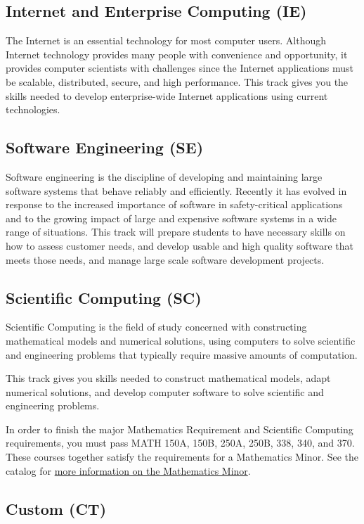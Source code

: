 \documentclass{book}
\newcommand{\IeTrackName}{Internet and Enterprise Computing (IE)}
\newcommand{\SeTrackName}{Software Engineering (SE)}
\newcommand{\ScTrackName}{Scientific Computing (SC)}
\newcommand{\cttrackname}{Custom (CT)}
\begin{document}
\subsection{\IeTrackName}
\IeTrackIndex
The Internet is an essential technology for most computer users. Although Internet technology provides many people with convenience and opportunity, it provides computer scientists with challenges since the Internet applications must be scalable, distributed, secure, and high performance. This track gives you the skills needed to develop enterprise-wide Internet applications using current technologies.

\subsection{\SeTrackName}
\SeTrackIndex
Software engineering is the discipline of developing and maintaining large software systems that behave reliably and efficiently. Recently it has evolved in response to the increased importance of software in safety-critical applications and to the growing impact of large and expensive software systems in a wide range of situations. This track will prepare students to have necessary skills on how to assess customer needs, and develop usable and high quality software that meets those needs, and manage large scale software development projects.

\subsection{\ScTrackName}
\ScTrackIndex

Scientific Computing is the field of study concerned with constructing mathematical models and numerical solutions, using computers to solve scientific and engineering problems that typically require massive amounts of computation.

This track gives you skills needed to construct mathematical models, adapt numerical solutions, and develop computer software to solve scientific and engineering problems.

In order to finish the major Mathematics Requirement and Scientific Computing requirements, you must pass MATH 150A, 150B, 250A, 250B, 338, 340, and 370. These courses together satisfy the requirements for a Mathematics Minor. See the catalog for \href{http://catalog.fullerton.edu/preview_program.php?catoid=2&poid=625}{more information on the Mathematics Minor}.

\subsection{\cttrackname}
\cttrackindex
\end{document}
